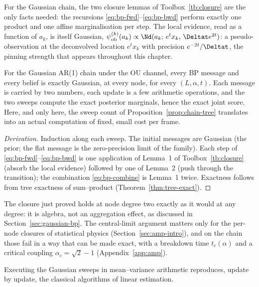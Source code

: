 For the Gaussian chain, the two closure lemmas of
Toolbox~\ref{tb:closure} are the only facts needed: the recursions
\eqref{eq:bp-fwd}--\eqref{eq:bp-bwd} perform exactly one product and one
affine marginalisation per step. The local evidence, read as a function
of $a_k$, is itself Gaussian,
$\psi^{(k)}_{\mathrm{ob}}(a_k) \propto
\Nd(a_k;\, e^{t} x_k,\, \Deltat e^{2t})$: a pseudo-observation at the
deconvolved location $e^t x_k$ with precision $e^{-2t}/\Deltat$, the
pinning strength that appears throughout this chapter.

\begin{theorem}\label{thm:bp-closure}
For the Gaussian AR(1) chain under the OU channel, every BP message and
every belief is exactly Gaussian, at every node, for every
$(L, \alpha, t)$. Each message is carried by two numbers, each update
is a few arithmetic operations, and the two sweeps compute the exact
posterior marginals, hence the exact joint score. Here, and only here,
the sweep count of Proposition~\ref{prop:chain-tree} translates into an
actual computation of fixed, small cost per frame.
\end{theorem}

\begin{proof}[Derivation]
Induction along each sweep. The initial messages are Gaussian (the
prior; the flat message is the zero-precision limit of the family). Each
step of \eqref{eq:bp-fwd}--\eqref{eq:bp-bwd} is one application of
Lemma~1 of Toolbox~\ref{tb:closure} (absorb the local evidence) followed
by one of Lemma~2 (push through the transition); the combination
\eqref{eq:bp-combine} is Lemma~1 twice. Exactness follows from tree
exactness of sum--product (Theorem~\ref{thm:tree-exact}).
\end{proof}

\begin{remark}
\label{rmk:bp-no-clt}
The closure just proved holds at node degree two exactly as it would at
any degree: it is algebra, not an aggregation effect, as discussed in
Section~\ref{sec:gaussian-bp}. The central-limit argument matters only
for the per-node closures of statistical physics
(Section~\ref{sec:amp-intro}), and on the chain those fail in a way that
can be made exact, with a breakdown time $t_c(\alpha)$ and a critical
coupling $\alpha_c = \sqrt{2} - 1$ (Appendix~\ref{app:amp}).
\end{remark}

Executing the Gaussian sweeps in mean--variance arithmetic reproduces,
update by update, the classical algorithms of linear estimation.

